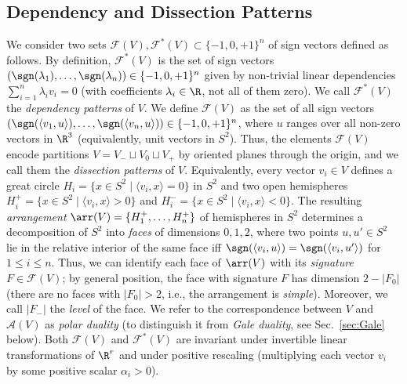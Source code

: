 \subsection{Dependency and Dissection Patterns}
\label{sec:DepDiss}
We consider two sets $\mathcal{F}(V),\mathcal{F}^*(V) \subset \{-1,0,+1\}^n$ of sign vectors defined as follows. 
%
By definition, $\mathcal{F}^*(V)$ is the set of sign vectors $(\sgn(\lambda_1),\dots,\sgn(\lambda_n)) \in \{-1,0,+1\}^n$ given by non-trivial linear dependencies $\sum_{i=1}^n \lambda_i v_i=0$ (with coefficients $\lambda_i\in \R$, not all of them zero). We call $\mathcal{F}^*(V)$ the \emph{dependency patterns} of $V$.
%
We define $\mathcal{F}(V)$ as the set of all sign vectors $(\sgn(\langle v_1,u\rangle),\dots,\sgn(\langle v_n,u\rangle)) \in \{-1,0,+1\}^n$, where $u$ ranges over all non-zero vectors in $\R^3$ (equivalently, unit vectors in $S^2$). Thus, the elements $\mathcal{F}(V)$ encode partitions $V=V_-\sqcup V_0 \sqcup V_+$ by oriented planes through the origin, and we call them the \emph{dissection patterns} of $V$. Equivalently, every vector $v_i \in V$ defines a great circle 
$
H_i = \{ x \in S^2 \mid \langle v_i, x \rangle = 0 \}
$
in $S^2$ and two open hemispheres $H_i^+ = \{ x \in S^2 \mid \langle v_i, x \rangle >0 \}$ and $H_i^- = \{ x \in S^2 \mid \langle v_i, x \rangle < 0 \}.$
The resulting \emph{arrangement} $\arr(V)=\{H_1^+,\dots,H_n^+\}$ of hemispheres in $S^2$ determines a decomposition of $S^2$ into \emph{faces} of dimensions $0,1,2$, 
where two points $u,u'\in S^2$ lie in the relative interior of the same face iff $\sgn(\langle v_i,u \rangle)=\sgn(\langle v_i,u'\rangle)$ for $1\leq i\leq n$. Thus, we can identify each face of $\arr(V)$ with its \emph{signature} $F\in \mathcal{F}(V)$; by general position, the face with signature $F$ has dimension $2-|F_0|$ (there are no faces with $|F_0|>2$, i.e., the arrangement is \emph{simple}). Moreover, we call $|F_-|$ the \emph{level} of the face. We 
refer to the correspondence between $V$ and $\mathcal{A}(V)$ as \emph{polar duality} (to distinguish it from \emph{Gale duality}, see Sec.~\ref{sec:Gale} below).
%
Both $\mathcal{F}(V)$ and $\mathcal{F}^*(V)$ are invariant under invertible linear transformations of $\R^r$ and under positive rescaling (multiplying each vector $v_i$ by some positive scalar $\alpha_i>0$).
%
